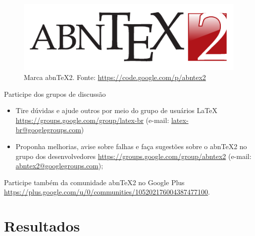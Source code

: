 \documentclass[aspectratio=169]{beamer}
\begin{document}
\begin{frame}

\begin{figure}
  \centering
  \includegraphics[scale=1.0]{abntex2-modelo-img-marca.pdf}
  \caption{Marca abnTeX2. Fonte: \url{https://code.google.com/p/abntex2}}
\end{figure}

\end{frame}

\begin{frame}{Participe dos grupos de discussão}

\begin{itemize}
  \item Tire dúvidas e ajude outros por meio do grupo de usuários LaTeX
  \url{https://groups.google.com/group/latex-br} (e-mail:
  \url{latex-br@googlegroups.com})
  
  \item Proponha melhorias, avise sobre falhas e faça sugestões sobre o abnTeX2
  no grupo dos desenvolvedores \url{https://groups.google.com/group/abntex2}
  (e-mail: \url{abntex2@googlegroups.com});
\end{itemize}

Participe também da comunidade abnTeX2 no Google Plus
\url{https://plus.google.com/u/0/communities/105202176004387477100}.

\end{frame}

\section{Resultados}
\end{document}
